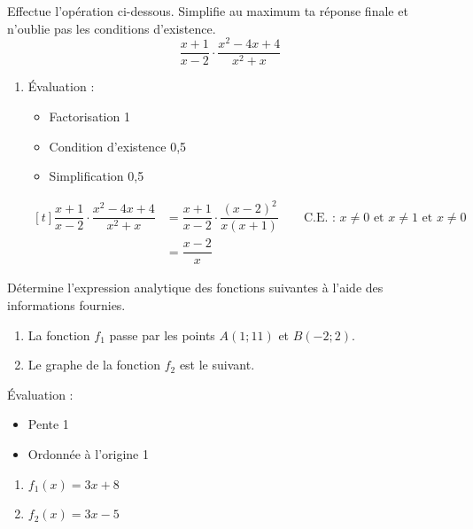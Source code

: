 \documentclass[a4paper, 12pt, parskip=half-]{scrartcl}
\begin{document}
\begin{exercise}[points=2]
    Effectue l'opération ci-dessous. Simplifie au maximum ta réponse finale et n'oublie pas les conditions d'existence.
    \[\dfrac{x+1}{x-2}\cdot\dfrac{x^2-4x+4}{x^2 + x}\]
\end{exercise}
\begin{solution}
    \begin{enumerate}
        \item
              Évaluation :
              \begin{itemize}
                  \item Factorisation \hfill 1
                  \item Condition d'existence \hfill 0,5
                  \item Simplification \hfill 0,5
              \end{itemize}
              $\begin{aligned}[t]
                      \dfrac{x+1}{x-2}\cdot\dfrac{x^2-4x+4}{x^2 + x} & = \dfrac{x+1}{x-2}\cdot\dfrac{(x-2)^2}{x(x+1)} \qquad \text{C.E. : } x\ne 0 \text{ et } x\ne 1 \text{ et } x\ne 0 \\
                                                                     & =\dfrac{x-2}{x}
                  \end{aligned}$

    \end{enumerate}
\end{solution}
\begin{exercise}[points=4]
    Détermine l'expression analytique des fonctions suivantes à l'aide des informations fournies.
    \begin{enumerate}
        \item La fonction $f_1$ passe par les points $A(1;11)$ et $B(-2;2)$.
        \item Le graphe de la fonction $f_2$ est le suivant. 
    \end{enumerate}
\end{exercise}
\begin{solution}
    Évaluation :
    \begin{itemize}
        \item Pente \hfill 1
        \item Ordonnée à l'origine \hfill 1
    \end{itemize}
    \begin{enumerate}[cols=3]
        \item $f_1(x) = 3x + 8$
        \item $f_2(x) = 3x - 5$
    \end{enumerate}
\end{solution}
\end{document}
